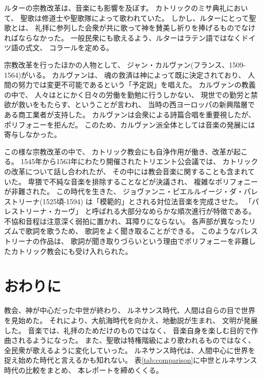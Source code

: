 \documentclass[a4j]{jarticle}
\begin{document}
ルターの宗教改革は、音楽にも影響を及ぼす。
カトリックのミサ典礼において、
聖歌は修道士や聖歌隊によって歌われていた。
しかし、ルターにとって聖歌とは、
礼拝に参列した会衆が共に歌って神を賛美し祈りを捧げるものでなければならなかった。
一般民衆にも歌えるよう、ルターはラテン語ではなくドイツ語の式文、
コラールを定める。

宗教改革を行ったほかの人物として、
ジャン・カルヴァン(フランス、1509-1564)がいる。
カルヴァンは、
魂の救済は神によって既に決定されており、
人間の努力では変更不可能であるという「予定説」を唱えた。
カルヴァンの教義の中で、
人々はとにかく日々の労働を勤勉に行うしかない、
現世での勤労と禁欲が救いをもたらす、ということが言われ、
当時の西ヨーロッパの新興階層である商工業者が支持した。
カルヴァンは会衆による詩篇合唱を重要視したが、
ポリフォニーを拒んだ。
このため、カルヴァン派全体としては音楽の発展には寄与しなかった。


この様な宗教改革の中で、
カトリック教会にも自浄作用が働き、改革が起こる。
1545年から1563年にわたり開催されたトリエント公会議では、
カトリックの改革について話し合われたが、
その中には教会音楽に関することも含まれていた。
卑猥で不純な音楽を排除することなどが決議され、
複雑なポリフォニーが非難された。
この時代を生きた、
ジョヴァンニ・ピエルルイージ・ダ・パレストリーナ(1525頃-1594)
は「模範的」とされる対位法音楽を完成させた。
「パレストリーナ・カーヴ」
と呼ばれる大部分なめらかな順次進行が特徴である。
不協和音程は注意深く弱拍に置かれ、耳障りにならない。
各声部が異なったリズムで歌詞を歌うため、
歌詞をよく聞き取ることができる。
このようなパレストリーナの作品は、
歌詞が聞き取りづらいという理由でポリフォニーを非難したカトリック教会にも受け入れられた。

\section{おわりに\label{sec:sum}}

教会、神が中心だった中世が終わり、
ルネサンス時代、人間は自らの目で世界を見始めた。
それにより、大航海時代を向かえ、地動説が生まれ、
文明が発展した。
音楽では、礼拝のためだけのものではなく、
音楽自身を楽しむ目的で作曲されるようになった。
また、聖歌は特権階級により歌われるものではなく、
全民衆が歌えるように変化していった。
ルネサンス時代は、人間中心に世界を捉え始めた時代と言えるかも知れない。
表\ref{tab:comparison}に中世とルネサンス時代の比較をまとめ、
本レポートを締めくくる。
\end{document}
